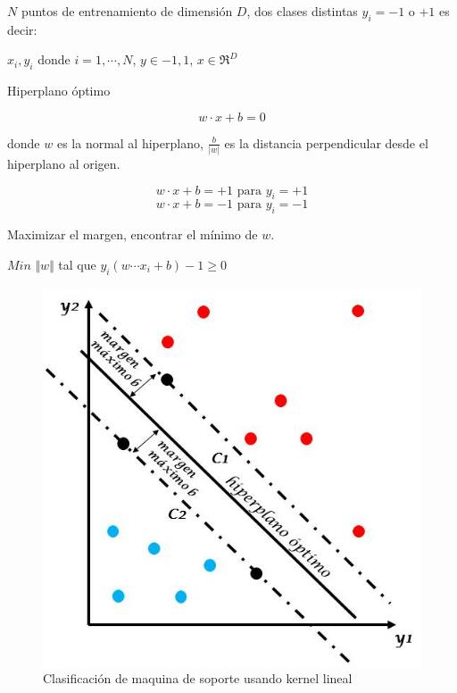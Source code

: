 $N$ puntos de entrenamiento de dimensión $D$, dos clases distintas $y_i=-1$
o $+1$ es decir: 

${x_i,y_i}$ donde $i=1, \cdots ,N$, $y\in{-1,1}$, $x \in \Re^D$  

Hiperplano óptimo 
 
$$ w \cdot x + b = 0$$ 

donde $w$ es la normal al hiperplano, $\frac{b}{|w|}$ es la distancia perpendicular desde el hiperplano al origen.   

$$ w \cdot x + b = +1 \textrm{ para } y_i=+1$$ 
$$ w \cdot x + b = -1 \textrm{ para } y_i=-1$$ 

Maximizar el margen, encontrar el mínimo de $w$.  

$Min$ $\Vert w \Vert$ tal que $y_i(w \cdots x_i + b) -1 \geq 0$
 
\begin{figure}[!h]
\begin{center}
\includegraphics[scale=.3]{./Figures/maquinaSoporte.jpg}
\end{center}
\caption{Clasificación de maquina de soporte usando kernel lineal}
\label{fig:SVM}
\end{figure} 


\newpage

